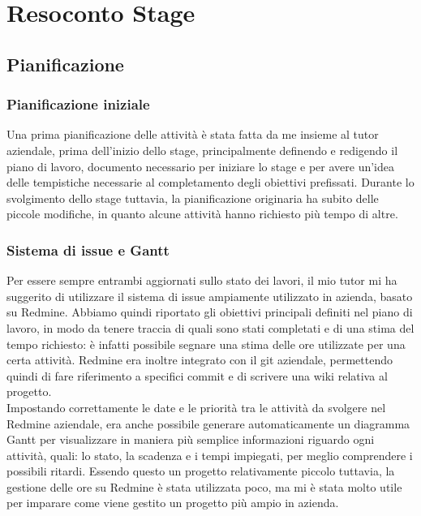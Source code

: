 
\chapter{Resoconto Stage}
\label{cap:resoconto-stage}

\section{Pianificazione}
\subsection{Pianificazione iniziale}\label{sec:pianificazione-iniziale}
Una prima pianificazione delle attività è stata fatta da me insieme al tutor aziendale, prima dell'inizio dello stage, principalmente definendo e redigendo il piano di lavoro, documento necessario per iniziare lo stage e per avere un'idea delle tempistiche necessarie al completamento degli obiettivi prefissati. Durante lo svolgimento dello stage tuttavia, la pianificazione originaria ha subito delle piccole modifiche, in quanto alcune attività hanno richiesto più tempo di altre. 

\subsection{Sistema di issue e Gantt}
Per essere sempre entrambi aggiornati sullo stato dei lavori, il mio tutor mi ha suggerito di utilizzare il sistema di issue ampiamente utilizzato in azienda, basato su Redmine. Abbiamo quindi riportato gli obiettivi principali definiti nel piano di lavoro, in modo da tenere traccia di quali sono stati completati e di una stima del tempo richiesto: è infatti possibile segnare una stima delle ore utilizzate per una certa attività. Redmine era inoltre integrato con il git aziendale, permettendo quindi di fare riferimento a specifici commit e di scrivere una wiki relativa al progetto.
\\
Impostando correttamente le date e le priorità tra le attività da svolgere nel Redmine aziendale, era anche possibile generare automaticamente un diagramma Gantt per visualizzare in maniera più semplice informazioni riguardo ogni attività, quali: lo stato, la scadenza e i tempi impiegati, per meglio comprendere i possibili ritardi. Essendo questo un progetto relativamente piccolo tuttavia, la gestione delle ore su Redmine è stata utilizzata poco, ma mi è stata molto utile per imparare come viene gestito un progetto più ampio in azienda.

